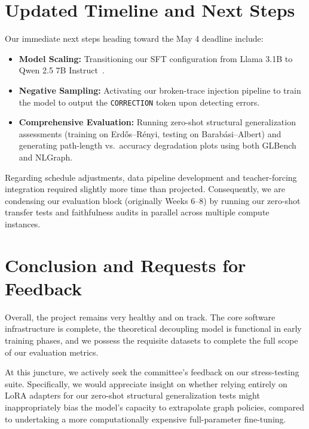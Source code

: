 \documentclass[sigplan,screen]{acmart}
\begin{document}
\section{Updated Timeline and Next Steps}

Our immediate next steps heading toward the May 4 deadline include:
\begin{itemize}
    \item \textbf{Model Scaling:} Transitioning our SFT configuration from Llama 3.1B to Qwen 2.5 7B Instruct~\cite{qwen2024}.
    \item \textbf{Negative Sampling:} Activating our broken-trace injection pipeline to train the model to output the \texttt{CORRECTION} token upon detecting errors.
    \item \textbf{Comprehensive Evaluation:} Running zero-shot structural generalization assessments (training on Erd\H{o}s--R\'{e}nyi, testing on Barab\'{a}si--Albert) and generating path-length vs.\ accuracy degradation plots using both GLBench and NLGraph.
\end{itemize}

Regarding schedule adjustments, data pipeline development and teacher-forcing integration required slightly more time than projected. Consequently, we are condensing our evaluation block (originally Weeks 6--8) by running our zero-shot transfer tests and faithfulness audits in parallel across multiple compute instances.

\section{Conclusion and Requests for Feedback}

Overall, the project remains very healthy and on track. The core software infrastructure is complete, the theoretical decoupling model is functional in early training phases, and we possess the requisite datasets to complete the full scope of our evaluation metrics.

At this juncture, we actively seek the committee's feedback on our stress-testing suite. Specifically, we would appreciate insight on whether relying entirely on LoRA adapters for our zero-shot structural generalization tests might inappropriately bias the model's capacity to extrapolate graph policies, compared to undertaking a more computationally expensive full-parameter fine-tuning.
\end{document}
